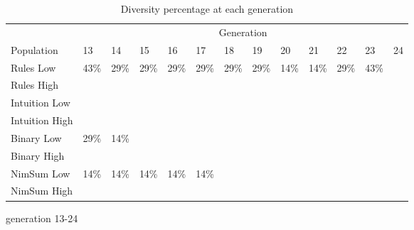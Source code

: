 \begin{table}
	\medskip
	\begin{subtable}{\linewidth}
	\centering
		\begin{tabular}{l|llllllllllll}\hline
		\multicolumn{1}{l}{} & \multicolumn{12}{c}{Generation} \\
		\multicolumn{1}{l}{Population} & 13 & 14 & 15 & 16 & 17 & 18 & 19 & 20 & 21 & 22 & 23 & 24\\\hline
		Rules Low & 43\% & 29\% & 29\% & 29\% & 29\% & 29\% & 29\% & 14\% & 14\% & 29\% & 43\% & \textemdash \\
		Rules High & \textemdash & \textemdash & \textemdash & \textemdash & \textemdash & \textemdash & \textemdash & \textemdash & \textemdash & \textemdash & \textemdash & \textemdash \\
		Intuition Low & \textemdash & \textemdash & \textemdash & \textemdash & \textemdash & \textemdash & \textemdash & \textemdash & \textemdash & \textemdash & \textemdash & \textemdash \\
		Intuition High & \textemdash & \textemdash & \textemdash & \textemdash & \textemdash & \textemdash & \textemdash & \textemdash & \textemdash & \textemdash & \textemdash & \textemdash \\
		Binary Low & 29\% & 14\% & \textemdash & \textemdash & \textemdash & \textemdash & \textemdash & \textemdash & \textemdash & \textemdash & \textemdash & \textemdash \\
		Binary High & \textemdash & \textemdash & \textemdash & \textemdash & \textemdash & \textemdash & \textemdash & \textemdash & \textemdash & \textemdash & \textemdash & \textemdash \\
		NimSum Low & 14\% & 14\% & 14\% & 14\% & 14\% & \textemdash & \textemdash & \textemdash & \textemdash & \textemdash & \textemdash & \textemdash \\
		NimSum High & \textemdash & \textemdash & \textemdash & \textemdash & \textemdash & \textemdash & \textemdash & \textemdash & \textemdash & \textemdash & \textemdash & \textemdash \\
		\end{tabular}
	\caption{generation 13-24}
	\end{subtable}
	\caption{Diversity percentage at each generation}
	\label{tab:results_diversity}
\end{table}
